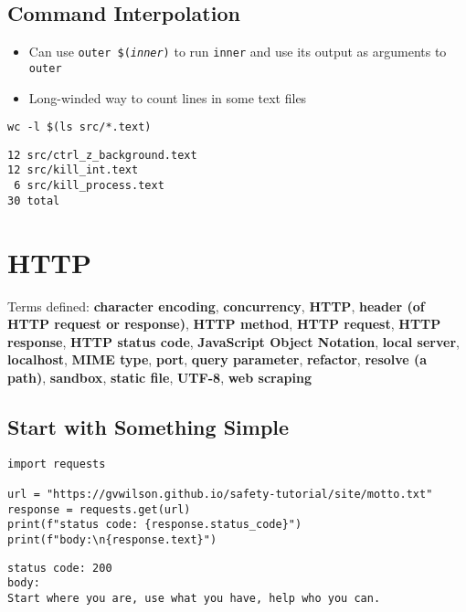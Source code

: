 \documentclass[krantzl]{krantz}
\newcommand{\glossref}[1]{\textbf{#1}}
\begin{document}
\section{Command Interpolation}
\begin{itemize}
\item Can use \texttt{outer \$(\emph{inner})} to run \texttt{inner} and use its output as arguments to \texttt{outer}

\item Long-winded way to count lines in some text files

\end{itemize}
\begin{lstlisting}[frame=tblr]
wc -l $(ls src/*.text)
\end{lstlisting}

\begin{lstlisting}[frame=tblr,backgroundcolor=\color{black!5}]
12 src/ctrl_z_background.text
12 src/kill_int.text
 6 src/kill_process.text
30 total
\end{lstlisting}

\chapter{HTTP}\label{http}




Terms defined: 
\glossref{character encoding}, \glossref{concurrency}, \glossref{HTTP}, \glossref{header (of HTTP request or response)}, \glossref{HTTP method}, \glossref{HTTP request}, \glossref{HTTP response}, \glossref{HTTP status code}, \glossref{JavaScript Object Notation}, \glossref{local server}, \glossref{localhost}, \glossref{MIME type}, \glossref{port}, \glossref{query parameter}, \glossref{refactor}, \glossref{resolve (a path)}, \glossref{sandbox}, \glossref{static file}, \glossref{UTF-8}, \glossref{web scraping}


\section{Start with Something Simple}
\begin{lstlisting}[frame=tblr]
import requests

url = "https://gvwilson.github.io/safety-tutorial/site/motto.txt"
response = requests.get(url)
print(f"status code: {response.status_code}")
print(f"body:\n{response.text}")
\end{lstlisting}

\begin{lstlisting}[frame=tblr,backgroundcolor=\color{black!5}]
status code: 200
body:
Start where you are, use what you have, help who you can.
\end{lstlisting}
\end{document}
